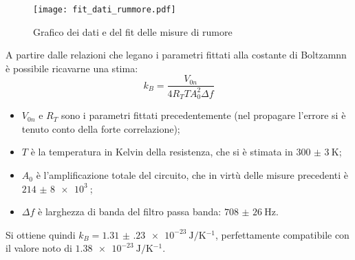 	\begin{figure}[H]
		\centering
		\texttt{[image: fit\_dati\_rummore.pdf]}
		\caption{Grafico dei dati e del fit delle misure di rumore}
		\label{fig:fit_rumore}
	\end{figure}
	
A partire dalle relazioni che legano i parametri fittati alla costante di Boltzamnn è possibile ricavarne una stima:
$$ k_B = \frac{V_{0n}}{4R_T T A_0^2 \Delta f}$$
\begin{itemize}
	\item $V_{0n}$ e $R_T$ sono i parametri fittati precedentemente (nel propagare l'errore si è tenuto conto della forte correlazione);
	\item $T$ è la temperatura in Kelvin della resistenza, che si è stimata in $\SI{300(3)}{\K}$;
	\item $A_0$ è l'amplificazione totale del circuito, che in virtù delle misure precedenti è $\SI{214(8)e3}{}$;
	\item $\Delta f$ è larghezza di banda del filtro passa banda: $\SI{708(26)}{\hertz}$.
\end{itemize}

Si ottiene quindi $k_B = \SI{1.31(23)e-23}{\J \per \kelvin^{-1}}$, perfettamente compatibile con il valore noto di $\SI{1.38e-23}{\J \per \kelvin^{-1}}$.